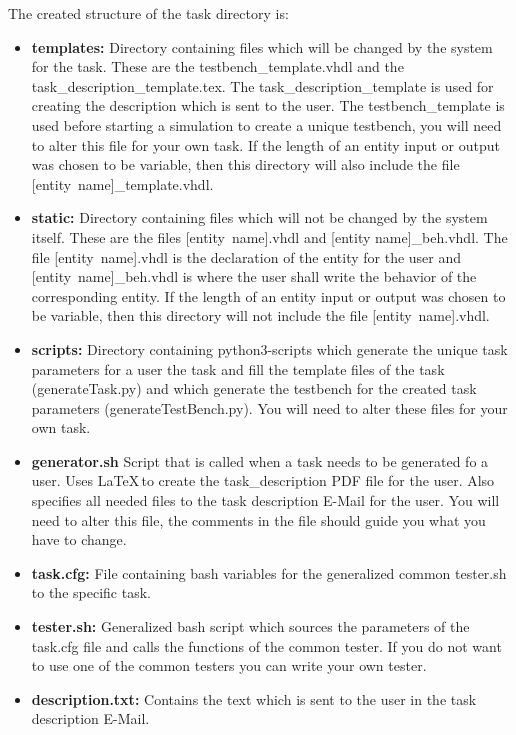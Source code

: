 The created structure of the task directory is:
\begin{itemize}
\item {\bf templates:} Directory containing files which will be changed by the system for the task. These are the
testbench\_template.vhdl and the task\_description\_template.tex. The task\_description\_template is used for creating
the description which is sent to the user. The testbench\_template is used before starting a simulation to create a
unique testbench, you will need to alter this file for your own task. If the length of an entity input or output was
chosen to be variable, then this directory will also include the file \mbox{[entity name]\_template.vhdl}.
\item {\bf static:} Directory containing files which will not be changed by the system itself. These are the files \mbox{[entity name].vhdl} and [entity name]\_beh.vhdl. The file \mbox{[entity name].vhdl} is the declaration of the entity for the user and \mbox{[entity name]\_beh.vhdl} is where the user shall write the behavior of the corresponding entity. If the length of an entity input or output was chosen to be variable, then this directory will not include the file \mbox{[entity name].vhdl}.
\item {\bf scripts:} Directory containing python3-scripts which generate the unique task parameters for a user the task and fill
the template files of the task (generateTask.py) and which generate the testbench for the created task parameters (generateTestBench.py). You will need to alter these files for your own task.
\item {\bf generator.sh} Script that is called when a task needs to be generated fo a user. Uses \LaTeX\,to create
the task\_description PDF file for the user. Also specifies all needed files to the task description E-Mail for the user. You will need to alter this file, the comments in the file should guide you what you have to change.
\item {\bf task.cfg:} File containing bash variables for the generalized common tester.sh to the specific task.
\item {\bf tester.sh:} Generalized bash script which sources the parameters of the task.cfg file and calls the functions of the common tester. If you do not want to use one of the common testers you can write your own tester.
\item {\bf description.txt:} Contains the text which is sent to the user in the task description E-Mail.
\end{itemize}


